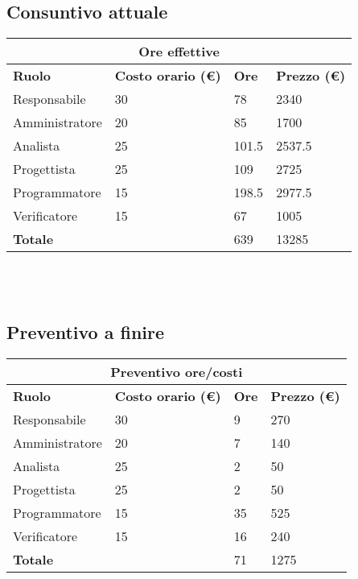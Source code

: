 \documentclass[a4paper, 12pt]{article}
\begin{document}
\subsection{Consuntivo attuale}
\begin{center}
    \begin{tabularx}{\textwidth}{|X|X|X|X|}
        \hline
        \multicolumn{4}{|c|}{\textbf{Ore effettive}}\\
        \hline
        \hline
        \textbf{Ruolo} & \textbf{Costo orario (\euro)} & \textbf{Ore} & \textbf{Prezzo (\euro)}\\
        \hline
        Responsabile    & 30 & 78  & 2340\\
        \hline
        Amministratore  & 20 & 85  & 1700\\
        \hline
        Analista        & 25 & 101.5  & 2537.5 \\
        \hline
        Progettista     & 25 & 109  & 2725\\
        \hline
        Programmatore   & 15 & 198.5  & 2977.5\\
        \hline
        Verificatore    & 15 & 67  & 1005 \\
        \hline
        \hline
        \textbf{Totale} &    & 639 & 13285\\
        \hline
    \end{tabularx}\\[8pt]
    \mbox{}\\
\end{center}

\subsection{Preventivo a finire}
\begin{center}
    \begin{tabularx}{\textwidth}{|X|X|X|X|}
        \hline
        \multicolumn{4}{|c|}{\textbf{Preventivo ore/costi}}\\
        \hline
        \hline
        \textbf{Ruolo} & \textbf{Costo orario (\euro)} & \textbf{Ore} & \textbf{Prezzo (\euro)}\\
        \hline
        Responsabile    & 30 & 9  & 270\\
        \hline
        Amministratore  & 20 & 7  & 140\\
        \hline
        Analista        & 25 & 2  & 50\\
        \hline
        Progettista     & 25 & 2  & 50\\
        \hline
        Programmatore   & 15 & 35  & 525\\
        \hline
        Verificatore    & 15 & 16  & 240\\
        \hline
        \hline
        \textbf{Totale} &    & 71 & 1275\\
        \hline
    \end{tabularx}\\[8pt]
    \mbox{}\\
\end{center}
\end{document}
